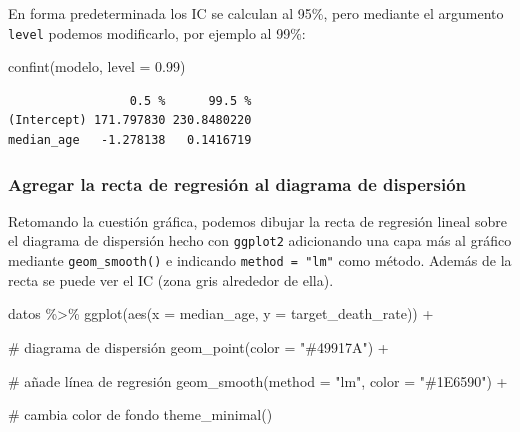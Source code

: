\documentclass[
  letterpaper,
  DIV=11,
  numbers=noendperiod]{scrartcl}
\newenvironment{Shaded}{\begin{snugshade}}{\end{snugshade}}
\newcommand{\AttributeTok}[1]{\textcolor[rgb]{0.40,0.45,0.13}{#1}}
\newcommand{\CommentTok}[1]{\textcolor[rgb]{0.37,0.37,0.37}{#1}}
\newcommand{\FloatTok}[1]{\textcolor[rgb]{0.68,0.00,0.00}{#1}}
\newcommand{\FunctionTok}[1]{\textcolor[rgb]{0.28,0.35,0.67}{#1}}
\newcommand{\NormalTok}[1]{\textcolor[rgb]{0.00,0.23,0.31}{#1}}
\newcommand{\SpecialCharTok}[1]{\textcolor[rgb]{0.37,0.37,0.37}{#1}}
\newcommand{\StringTok}[1]{\textcolor[rgb]{0.13,0.47,0.30}{#1}}
\begin{document}
En forma predeterminada los IC se calculan al 95\%, pero mediante el
argumento \texttt{level} podemos modificarlo, por ejemplo al 99\%:

\begin{Shaded}
\begin{Highlighting}[]
\FunctionTok{confint}\NormalTok{(modelo, }\AttributeTok{level =} \FloatTok{0.99}\NormalTok{)}
\end{Highlighting}
\end{Shaded}

\begin{verbatim}
                 0.5 %      99.5 %
(Intercept) 171.797830 230.8480220
median_age   -1.278138   0.1416719
\end{verbatim}

\subsubsection{Agregar la recta de regresión al diagrama de
dispersión}\label{agregar-la-recta-de-regresiuxf3n-al-diagrama-de-dispersiuxf3n}

Retomando la cuestión gráfica, podemos dibujar la recta de regresión
lineal sobre el diagrama de dispersión hecho con \texttt{ggplot2}
adicionando una capa más al gráfico mediante \texttt{geom\_smooth()} e
indicando \texttt{method\ =\ "lm"} como método. Además de la recta se
puede ver el IC (zona gris alrededor de ella).

\begin{Shaded}
\begin{Highlighting}[]
\NormalTok{datos }\SpecialCharTok{\%\textgreater{}\%} 
  \FunctionTok{ggplot}\NormalTok{(}\FunctionTok{aes}\NormalTok{(}\AttributeTok{x =}\NormalTok{ median\_age, }\AttributeTok{y =}\NormalTok{ target\_death\_rate)) }\SpecialCharTok{+}
  
 \CommentTok{\# diagrama de dispersión}
   \FunctionTok{geom\_point}\NormalTok{(}\AttributeTok{color =} \StringTok{"\#49917A"}\NormalTok{) }\SpecialCharTok{+}
  
  \CommentTok{\# añade línea de regresión}
  \FunctionTok{geom\_smooth}\NormalTok{(}\AttributeTok{method =} \StringTok{"lm"}\NormalTok{, }\AttributeTok{color =} \StringTok{"\#1E6590"}\NormalTok{) }\SpecialCharTok{+} 
  
  \CommentTok{\# cambia color de fondo}
  \FunctionTok{theme\_minimal}\NormalTok{()}
\end{Highlighting}
\end{Shaded}
\end{document}
